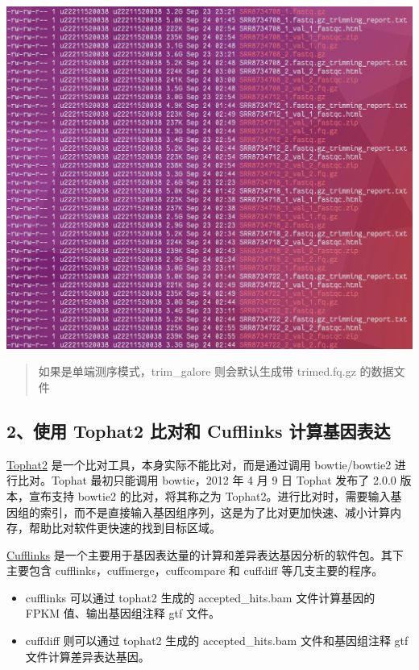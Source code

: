 \documentclass[
  a4paper,
]{article}
\providecommand{\tightlist}{%
  \setlength{\itemsep}{0pt}\setlength{\parskip}{0pt}}\usepackage{longtable,booktabs,array}
\begin{document}
\begin{enumerate}
  \includegraphics{assets/image-20220927195628-y81zt42.png}\hspace{0pt}
\end{enumerate}

\begin{quote}
如果是单端测序模式，trim\_galore 则会默认生成带 trimed.fq.gz 的数据文件
\end{quote}

\hypertarget{ux4f7fux7528-tophat2-ux6bd4ux5bf9ux548c-cufflinks-ux8ba1ux7b97ux57faux56e0ux8868ux8fbe}{%
\subsection{2、使用 Tophat2 比对和 Cufflinks
计算基因表达}\label{ux4f7fux7528-tophat2-ux6bd4ux5bf9ux548c-cufflinks-ux8ba1ux7b97ux57faux56e0ux8868ux8fbe}}

\href{https://ccb.jhu.edu/software/tophat/index.shtml}{Tophat2}
是一个比对工具，本身实际不能比对，而是通过调用 bowtie/bowtie2
进行比对。Tophat 最初只能调用 bowtie，2012 年 4 月 9 日 Tophat 发布了
2.0.0 版本，宣布支持 bowtie2 的比对，将其称之为
Tophat2。进行比对时，需要输入基因组的索引，而不是直接输入基因组序列，这是为了比对更加快速、减小计算内存，帮助比对软件更快速的找到目标区域。

\href{http://cole-trapnell-lab.github.io/cufflinks/}{Cufflinks}
是一个主要用于基因表达量的计算和差异表达基因分析的软件包。其下主要包含
cufflinks，cuffmerge，cuffcompare 和 cuffdiff 等几支主要的程序。

\begin{itemize}
\tightlist
\item
  cufflinks 可以通过 tophat2 生成的 accepted\_hits.bam 文件计算基因的
  FPKM 值、输出基因组注释 gtf 文件。
\item
  cuffdiff 则可以通过 tophat2 生成的 accepted\_hits.bam 文件和基因组注释
  gtf 文件计算差异表达基因。
\end{itemize}
\end{document}

